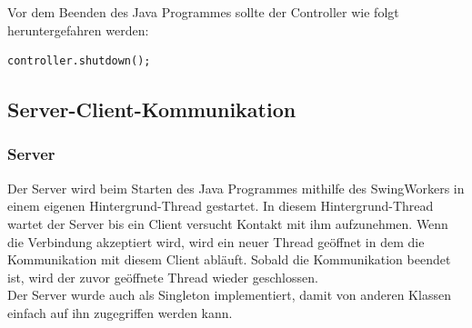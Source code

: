 Vor dem Beenden des Java Programmes sollte der Controller wie folgt heruntergefahren werden:
\begin{lstlisting}[style=JavaStyle, caption=Controller herunterfahren]
	controller.shutdown();
\end{lstlisting}

\subsection{Server-Client-Kommunikation}
\subsubsection{Server}
Der Server wird beim Starten des Java Programmes mithilfe des SwingWorkers in einem eigenen Hintergrund-Thread gestartet. In diesem Hintergrund-Thread wartet der Server bis ein Client versucht Kontakt mit ihm aufzunehmen. Wenn die Verbindung akzeptiert wird, wird ein neuer Thread geöffnet in dem die Kommunikation mit diesem Client abläuft. Sobald die Kommunikation beendet ist, wird der zuvor geöffnete Thread wieder geschlossen. 
\\ Der Server wurde auch als Singleton implementiert, damit von anderen Klassen einfach auf ihn zugegriffen werden kann.

